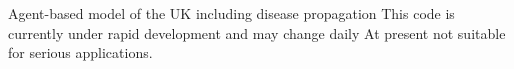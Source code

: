 Agent-\/based model of the UK including disease propagation This code is currently under rapid development and may change daily At present not suitable for serious applications. 